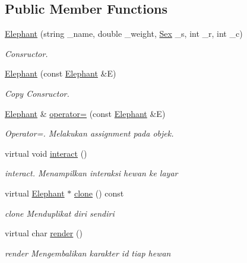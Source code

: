 \subsection*{Public Member Functions}
\begin{DoxyCompactItemize}
\item 
\hyperlink{classElephant_a7a94c60757db4cfc466fb14be048472e}{Elephant} (string \+\_\+name, double \+\_\+weight, \hyperlink{sex_8h_a2633cb393c68bb2ee8080db58fb7ba93}{Sex} \+\_\+s, int \+\_\+r, int \+\_\+c)
\begin{DoxyCompactList}\small\item\em Consructor. \end{DoxyCompactList}\item 
\hyperlink{classElephant_a1ca9260043931fcd63f2be2694e74ead}{Elephant} (const \hyperlink{classElephant}{Elephant} \&E)
\begin{DoxyCompactList}\small\item\em Copy Consructor. \end{DoxyCompactList}\item 
\hyperlink{classElephant}{Elephant} \& \hyperlink{classElephant_a822345b7b81981324451feb7603fdf07}{operator=} (const \hyperlink{classElephant}{Elephant} \&E)
\begin{DoxyCompactList}\small\item\em Operator=. Melakukan assignment pada objek. \end{DoxyCompactList}\item 
virtual void \hyperlink{classElephant_a26c7fe6f59e30b8cf400004edd2d3196}{interact} ()
\begin{DoxyCompactList}\small\item\em interact. Menampilkan interaksi hewan ke layar \end{DoxyCompactList}\item 
virtual \hyperlink{classElephant}{Elephant} $\ast$ \hyperlink{classElephant_a5f3470439cfb819eb68a8ebc070ffaee}{clone} () const 
\begin{DoxyCompactList}\small\item\em clone Menduplikat diri sendiri \end{DoxyCompactList}\item 
virtual char \hyperlink{classElephant_a96ae3a5917af96a358079c57e0b2e3b5}{render} ()
\begin{DoxyCompactList}\small\item\em render Mengembalikan karakter id tiap hewan \end{DoxyCompactList}\item 

\end{DoxyCompactItemize}
